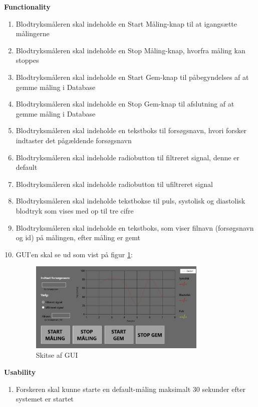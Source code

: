 \textbf{Functionality}
\begin{enumerate}
\item Blodtryksmåleren skal indeholde en Start Måling-knap til at igangsætte målingerne 
\item Blodtryksmåleren skal indeholde en Stop Måling-knap, hvorfra måling kan stoppes
\item Blodtryksmåleren skal indeholde en Start Gem-knap til påbegyndelses af at gemme måling i Database
\item Blodtryksmåleren skal indeholde en Stop Gem-knap til afslutning af at gemme måling i Database 
\item Blodtryksmåleren skal indeholde en tekstboks til forsøgsnavn, hvori forsker indtaster det pågældende forsøgsnavn
\item Blodtryksmåleren skal indeholde radiobutton til filtreret signal, denne er default
\item Blodtryksmåleren skal indeholde radiobutton til ufiltreret signal
\item Blodtryksmåleren skal indeholde tekstbokse til puls, systolisk og diastolisk blodtryk som vises med op til tre cifre
\item Blodtryksmåleren skal indeholde en tekstboks, som viser filnavn (forsøgsnavn og id) på målingen, efter måling er gemt 
\item GUI’en skal se ud som vist på figur \ref{fig:Skitse af GUI}:
\begin{figure}[H]
	\centering
	\includegraphics[width=0.8\textwidth]{Figurer/HovedGUI}
	\caption{Skitse af GUI}
	\label{fig:Skitse af GUI}
\end{figure}

\end{enumerate}

\textbf{Usability}
\begin{enumerate}
\item Forskeren skal kunne starte en default-måling maksimalt 30 sekunder efter systemet er startet
\end{enumerate}
                                                                                                

